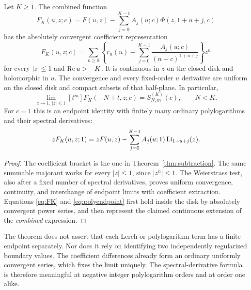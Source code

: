 \begin{theorem}\label{thm:endpoint}
Let $K\ge1$.  The combined function
\begin{equation}\label{eq:FK}
 F_K(u,z;c)=F(u,z)-\sum_{j=0}^{K-1}
                         A_j(u;c)\Phi(z,1+u+j,c)
\end{equation}
has the absolutely convergent coefficient representation
\[
 F_K(u,z;c)=\sum_{n\ge0}\left\{r_n(u)
       -\sum_{j=0}^{K-1}\frac{A_j(u;c)}{(n+c)^{1+u+j}}\right\}z^n
\]
for every $|z|\le1$ and $\operatorname{Re} u>-K$.
It is continuous in $z$ on the closed disk and holomorphic in $u$.
The convergence and every fixed-order $u$ derivative are uniform on the
closed disk and compact subsets of that half-plane.  In particular,
\begin{equation}\label{eq:endpoint}
 \lim_{z\to1,\ |z|\le1}[t^m]F_K(-N+t,z;c)
 =S_{N,m}^{(K)}(c),\qquad N<K.
\end{equation}
For $c=1$ this is an endpoint identity with finitely many ordinary
polylogarithms and their spectral derivatives:
\begin{equation}\label{eq:polyendpoint}
 zF_K(u,z;1)=zF(u,z)-\sum_{j=0}^{K-1}
                                    A_j(u;1)\operatorname{Li}_{1+u+j}(z).
\end{equation}
\end{theorem}
\begin{proof}
The coefficient bracket is the one in Theorem~\ref{thm:subtraction}.
The same summable majorant works for every $|z|\le1$, since $|z^n|\le1$.
The Weierstrass test, also after a fixed number of spectral derivatives,
proves uniform convergence, continuity, and interchange of endpoint limits
with coefficient extraction.  Equations \eqref{eq:FK} and
\eqref{eq:polyendpoint} first hold inside the disk by absolutely convergent
power series, and then represent the claimed continuous extension of the
\emph{combined} expression.
\end{proof}

\begin{remark}
The theorem does not assert that each Lerch or polylogarithm term has a
finite endpoint separately.  Nor does it rely on identifying two
independently regularized boundary values.  The coefficient differences
already form an ordinary uniformly convergent series, which fixes the
limit uniquely.  The spectral-derivative formula is therefore meaningful
at negative integer polylogarithm orders and at order one alike.
\end{remark}

